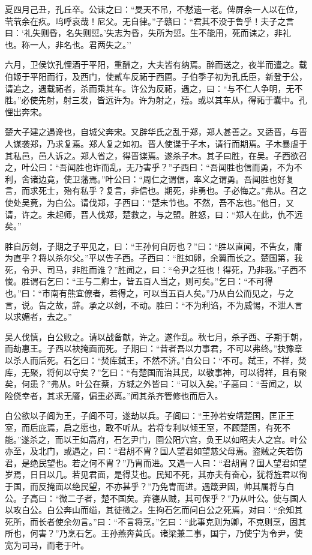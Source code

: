 \documentclass[]{article}
\begin{document}
夏四月己丑，孔丘卒。公诔之曰：``旻天不吊，不憖遗一老。俾屏余一人以在位，茕茕余在疚。呜呼哀哉！尼父。无自律。''子赣曰：``君其不没于鲁乎！夫子之言曰：`礼失则昏，名失则愆。'失志为昏，失所为愆。生不能用，死而诔之，非礼也。称一人，非名也。君两失之。''

六月，卫侯饮孔悝酒于平阳，重酬之，大夫皆有纳焉。醉而送之，夜半而遣之。载伯姬于平阳而行，及西门，使贰车反祏于西圃。子伯季子初为孔氏臣，新登于公，请追之，遇载祏者，杀而乘其车。许公为反祏，遇之，曰：``与不仁人争明，无不胜。''必使先射，射三发，皆远许为。许为射之，殪。或以其车从，得祏于囊中。孔悝出奔宋。

楚大子建之遇谗也，自城父奔宋。又辟华氏之乱于郑，郑人甚善之。又适晋，与晋人谋袭郑，乃求复焉。郑人复之如初。晋人使谍于子木，请行而期焉。子木暴虐于其私邑，邑人诉之。郑人省之，得晋谍焉。遂杀子木。其子曰胜，在吴。子西欲召之，叶公曰：``吾闻胜也诈而乱，无乃害乎？''子西曰：``吾闻胜也信而勇，不为不利，舍诸边竟，使卫藩焉。''叶公曰：``周仁之谓信，率义之谓勇。吾闻胜也好复言，而求死士，殆有私乎？复言，非信也。期死，非勇也。子必悔之。''弗从。召之使处吴竟，为白公。请伐郑，子西曰：``楚未节也。不然，吾不忘也。''他日，又请，许之。未起师，晋人伐郑，楚救之，与之盟。胜怒，曰：``郑人在此，仇不远矣。''

胜自厉剑，子期之子平见之，曰：``王孙何自厉也？''曰：``胜以直闻，不告女，庸为直乎？将以杀尔父。''平以告子西。子西曰：``胜如卵，余翼而长之。楚国第，我死，令尹、司马，非胜而谁？''胜闻之，曰：``令尹之狂也！得死，乃非我。''子西不悛。胜谓石乞曰：``王与二卿士，皆五百人当之，则可矣。''乞曰：``不可得也。''曰：``市南有熊宜僚者，若得之，可以当五百人矣。''乃从白公而见之，与之言，说。告之故，辞。承之以剑，不动。胜曰：``不为利谄，不为威惕，不泄人言以求媚者，去之。''

吴人伐慎，白公败之。请以战备献，许之。遂作乱。秋七月，杀子西、子期于朝，而劫惠王。子西以袂掩面而死。子期曰：``昔者吾以力事君，不可以弗终。''抉豫章以杀人而后死。石乞曰：``焚库弑王，不然不济。''白公曰：``不可。弑王，不祥，焚库，无聚，将何以守矣？''乞曰：``有楚国而治其民，以敬事神，可以得祥，且有聚矣，何患？''弗从。叶公在蔡，方城之外皆曰：``可以入矣。''子高曰：``吾闻之，以险侥幸者，其求无餍，偏重必离。''闻其杀齐管修也而后入。

白公欲以子闾为王，子闾不可，遂劫以兵。子闾曰：``王孙若安靖楚国，匡正王室，而后庇焉，启之愿也，敢不听从。若将专利以倾王室，不顾楚国，有死不能。''遂杀之，而以王如高府，石乞尹门，圉公阳穴宫，负王以如昭夫人之宫。叶公亦至，及北门，或遇之，曰：``君胡不胄？国人望君如望慈父母焉。盗贼之矢若伤君，是绝民望也。若之何不胄？''乃胄而进。又遇一人曰：``君胡胄？国人望君如望岁焉，日日以几。若见君面，是得艾也。民知不死，其亦夫有奋心，犹将旌君以徇于国，而反掩面以绝民望，不亦甚乎？''乃免胄而进。遇箴尹固，帅其属将与白公。子高曰：``微二子者，楚不国矣。弃德从贼，其可保乎？''乃从叶公。使与国人以攻白公。白公奔山而缢，其徒微之。生拘石乞而问白公之死焉，对曰：``余知其死所，而长者使余勿言。''曰：``不言将烹。''乞曰：``此事克则为卿，不克则烹，固其所也，何害？''乃烹石乞。王孙燕奔黄氏。诸梁兼二事，国宁，乃使宁为令尹，使宽为司马，而老于叶。
\end{document}
